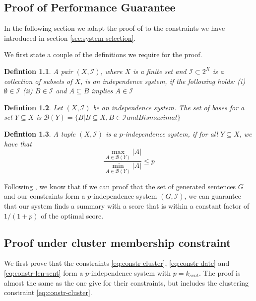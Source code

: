 \documentclass[a4paper,BCOR=10mm]{report}
\numberwithin{lemma}{chapter}
\newtheorem{definition}{Defintion}
\numberwithin{definition}{chapter}
\begin{document}
\begin{appendices}
\chapter{Proof of Performance Guarantee}

In the following section we adapt the proof of \citet{markert} to the constraints we have introduced in section \ref{sec:system-selection}.

We first state a couple of the definitions we require for the proof.

\begin{definition}
A pair $(X, \mathcal{I})$, where $X$ is a finite set and $\mathcal{I} \subset 2^X$ is a collection of subsets of $X$, is an independence system, if the following holds: (i) $\emptyset \in \mathcal{I}$ (ii) $B \in \mathcal{I}$ and $A \subseteq B$ implies $A \in \mathcal{I}$
\end{definition}

\begin{definition}
Let $(X, \mathcal{I})$ be an independence system. The set of bases for a set $Y \subseteq X$ is $\mathcal{B}(Y) = \{B | B \subseteq X, B \in \mathcal{I} \mathit{ and } B \mathit{ is maximal} \}$
\end{definition}


\begin{definition}
A tuple $(X, \mathcal{I})$ is a $p$-independence system, if for all $Y \subseteq X$, we have that
\begin{equation}
 \frac{\max_{A \in \mathcal{B}(Y)} |A|}{\min_{A \in \mathcal{B}(Y)} |A|} \leq p
\end{equation}
\end{definition}

Following \citet{markert}, we know that if we can proof that the set of generated sentences $G$ and our constraints form a $p$-independence system $(G, \mathcal{I})$, we can guarantee that our system finds a summary with a score that is within a constant factor of $1 / (1 + p)$ of the optimal score.

\section{Proof under cluster membership constraint}

We first prove that the constraints \ref{eq:constr-cluster}, \ref{eq:constr-date} and \ref{eq:constr-len-sent} form a $p$-independence system with $p = k_{sent}$.
The proof is almost the same as the one \citet{markert} give for their constraints, but includes the clustering constraint \ref{eq:constr-cluster}.


\end{appendices}
\end{document}
